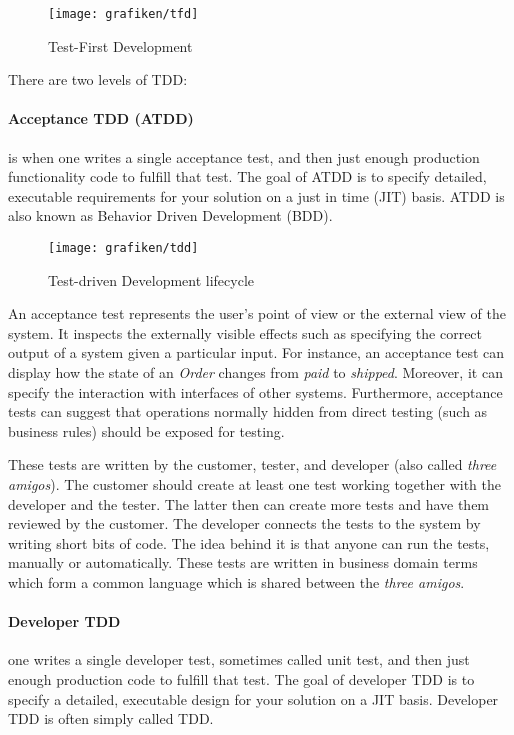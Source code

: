 \begin{figure}[H]
	\centering
    \texttt{[image: grafiken/tfd]}
    \caption{Test-First Development}
    \label{fig:tfd}
\end{figure}

There are two levels of TDD\cite{Ambler2013}:

\paragraph{Acceptance TDD (ATDD)} is when one writes a single acceptance test, and then just enough production functionality code to fulfill that test. The goal of ATDD is to specify detailed, executable requirements for your solution on a just in time (JIT) basis\cite{Ambler2013}. ATDD is also known as Behavior Driven Development (BDD).

\begin{figure}[H]
	\centering
    \texttt{[image: grafiken/tdd]}
    \caption{Test-driven Development lifecycle\cite{Ambler2013}}
    \label{fig:tdd}
\end{figure}

An acceptance test represents the user's point of view or the external view of the system. It inspects the externally visible effects such as specifying the correct output of a system given a particular input. For instance, an acceptance test can display how the state of an \emph{Order} changes from \emph{paid} to \emph{shipped}. Moreover, it can specify the interaction with interfaces of other systems. Furthermore, acceptance tests can suggest that operations normally hidden from direct testing (such as business rules) should be exposed for testing\cite{KennethPugh2011}.

These tests are written by the customer, tester, and developer (also called \emph{three amigos}\cite{Dinwiddie2009}). The customer should create at least one test working together with the developer and the tester. The latter then can create more tests and have them reviewed by the customer. The developer connects the tests to the system by writing short bits of code. The idea behind it is that anyone can run the tests, manually or automatically. These tests are written in business domain terms which form a common language which is shared between the \emph{three amigos}\cite{KennethPugh2011}.

\paragraph{Developer TDD} one writes a single developer test, sometimes called unit test, and then just enough production code to fulfill that test. The goal of developer TDD is to specify a detailed, executable design for your solution on a JIT basis. Developer TDD is often simply called TDD\cite{Ambler2013}.

